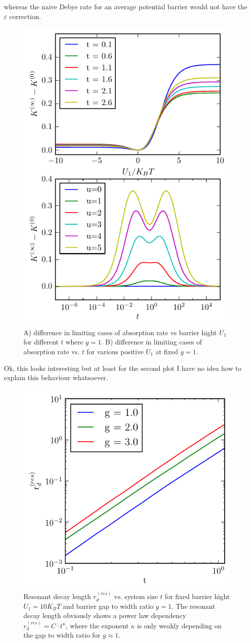 \documentclass[twocolumn,superscriptaddress]{revtex4}
\begin{document}
whereas the naive Debye rate for an average potential barrier would not have the $\varepsilon$ correction.
\begin{figure}[H]
\includegraphics[width= .5 \textwidth]{plots/diff_plot.pdf}
\caption{A) difference in limiting cases of absorption rate vs barrier hight $U_1$ for different $t$ where $g=1$. \newline B) difference in limiting cases of absorption rate vs. $t$ for various positive $U_1$ at fixed $g=1$.}
\label{fig4}
\end{figure}
Ok, this looks interesting but at least for the second plot I have no idea how to explain this behaviour whatsoever.
\begin{figure}[H]
\includegraphics[width= .5 \textwidth]{plots/resonant_decay_length.pdf}
\caption{Resonant decay length $r_d^{(res)}$ vs. system size $t$ for fixed barrier hight $U_1=10 K_B T$ and barrier gap to width ratio $g=1$. The resonant decay length obviously shows a power law dependency $r_d^{(res)}=C\cdot t^{\kappa}$, where the exponent $\kappa$ is only weakly depending on the gap to width ratio for $g \approx 1$.}
\label{fig5}
\end{figure}
\end{document}
